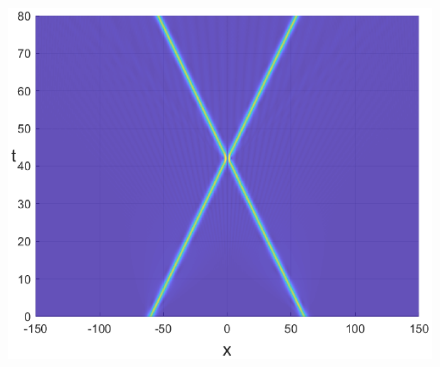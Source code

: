 \documentclass[preprint,12pt]{elsarticle}
\begin{document}
\begin{figure}[H]
\begin{minipage}[h]{0.32\linewidth}
\includegraphics[width=1\linewidth]{fig59.eps}
\end{minipage}


\end{figure}
\end{document}
